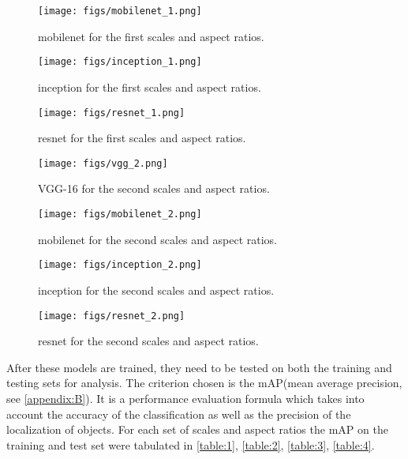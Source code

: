 \begin{figure}[!htpb]
	\centering
	\texttt{[image: figs/mobilenet\_1.png]}
	\caption{mobilenet for the first scales and aspect ratios.}\label{fig:mobilenet3_}
\end{figure}

\begin{figure}[!htpb]
	\centering
	\texttt{[image: figs/inception\_1.png]}
	\caption{inception for the first scales and aspect ratios.}\label{fig:inception1_}
\end{figure}

\begin{figure}[!htpb]
	\centering
	\texttt{[image: figs/resnet\_1.png]}
	\caption{resnet for the first scales and aspect ratios.}\label{fig:resnet1_}
\end{figure}

\begin{figure}[!htpb]
	\centering
	\texttt{[image: figs/vgg\_2.png]}
	\caption{VGG-16 for the second scales and aspect ratios.}\label{fig:vgg4_}
\end{figure}

\begin{figure}[!htpb]
	\centering
	\texttt{[image: figs/mobilenet\_2.png]}
	\caption{mobilenet for the second scales and aspect ratios.}\label{fig:mobilenet4_}
\end{figure}

\begin{figure}[!htpb]
	\centering
	\texttt{[image: figs/inception\_2.png]}
	\caption{inception for the second scales and aspect ratios.}\label{fig:inception4_}
\end{figure}

\begin{figure}[!htpb]
	\centering
	\texttt{[image: figs/resnet\_2.png]}
	\caption{resnet for the second scales and aspect ratios.}\label{fig:resnet4_}
\end{figure}

After these models are trained, they need to be tested on both the training and testing sets for analysis. The criterion chosen is the mAP(mean average precision, see \cref{appendix:B}). It is a performance evaluation formula which takes into account the accuracy of the classification as well as the precision of the localization of objects. For each set of scales and aspect ratios the mAP on the training and test set were tabulated in \cref{table:1}, \cref{table:2}, \cref{table:3}, \cref{table:4}.

